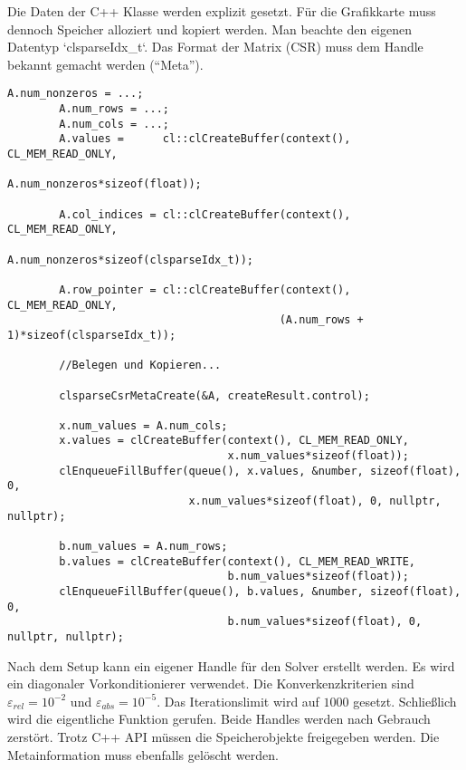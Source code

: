 		Die Daten der C++ Klasse werden explizit gesetzt. Für die Grafikkarte muss dennoch Speicher alloziert und kopiert werden. Man beachte den eigenen Datentyp \li`clsparseIdx_t`. Das Format der Matrix (CSR) muss dem \Gls{Handle} bekannt gemacht werden (\enquote{Meta}).\\
    	\begin{lstlisting}[caption=clSPARSE: Vektoren und Matrizen setzen]
		A.num_nonzeros = ...;
		A.num_rows = ...;
		A.num_cols = ...;    
		A.values =      cl::clCreateBuffer(context(), CL_MEM_READ_ONLY, 
		                                   A.num_nonzeros*sizeof(float));

		A.col_indices = cl::clCreateBuffer(context(), CL_MEM_READ_ONLY, 
		                                   A.num_nonzeros*sizeof(clsparseIdx_t));

		A.row_pointer = cl::clCreateBuffer(context(), CL_MEM_READ_ONLY, 
		                                  (A.num_rows + 1)*sizeof(clsparseIdx_t)); 
		
		//Belegen und Kopieren...
                                     
		clsparseCsrMetaCreate(&A, createResult.control);
      
		x.num_values = A.num_cols;
		x.values = clCreateBuffer(context(), CL_MEM_READ_ONLY, 
		                          x.num_values*sizeof(float));
		clEnqueueFillBuffer(queue(), x.values, &number, sizeof(float), 0, 
		                    x.num_values*sizeof(float), 0, nullptr, nullptr);
                                    
		b.num_values = A.num_rows;
		b.values = clCreateBuffer(context(), CL_MEM_READ_WRITE, 
		                          b.num_values*sizeof(float));
		clEnqueueFillBuffer(queue(), b.values, &number, sizeof(float), 0, 
		                          b.num_values*sizeof(float), 0, nullptr, nullptr);
		\end{lstlisting}  
		
		Nach dem Setup kann ein eigener \Gls{Handle} für den Solver erstellt werden. Es wird ein diagonaler Vorkonditionierer verwendet. Die Konverkenzkriterien sind $\varepsilon_{rel} = 10^{-2}$ und $\varepsilon_{abs} = 10^{-5}$. Das Iterationslimit wird auf $1000$ gesetzt. Schließlich wird die eigentliche Funktion gerufen. Beide \Glspl{Handle} werden nach Gebrauch zerstört. Trotz C++ \Gls{API} müssen die Speicherobjekte freigegeben werden. Die Metainformation muss ebenfalls gelöscht werden.
		
		\newpage
		                    
